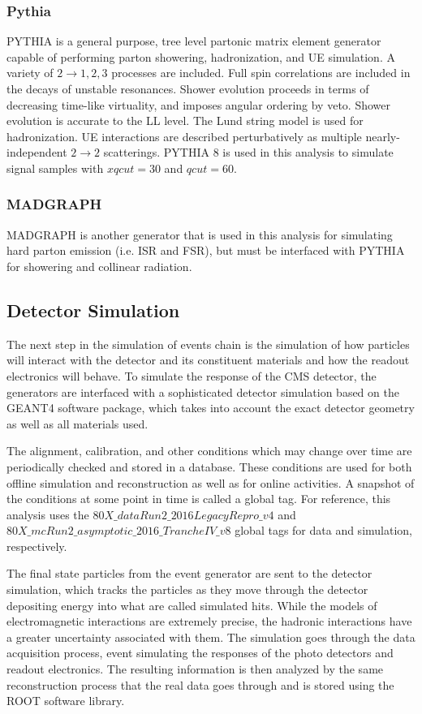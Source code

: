 \subsubsection{Pythia}

PYTHIA\cite{Sjostrand:2014zea} is a general purpose, tree level partonic matrix element generator capable of performing parton showering, hadronization, and UE simulation. A variety of $2\rightarrow1,2,3$ processes are included. Full spin correlations are included in the decays of unstable resonances. Shower evolution proceeds in terms of decreasing time-like virtuality, and imposes angular ordering by veto. Shower evolution is accurate to the LL level. The Lund string model is used for hadronization. UE interactions are described perturbatively as multiple nearly-independent $2\rightarrow 2$ scatterings. PYTHIA 8 is used in this analysis to simulate signal samples with $xqcut=30$ and $qcut=60$.

\subsubsection{MADGRAPH}

MADGRAPH\cite{Alwall:1647049} is another generator that is used in this analysis for simulating hard parton emission (i.e. ISR and FSR), but must be interfaced with PYTHIA for showering and collinear radiation.

\subsection{Detector Simulation}

The next step in the simulation of events chain is the simulation of how particles will interact with the detector and its constituent materials and how the readout electronics will behave. To simulate the response of the CMS detector, the generators are interfaced with a sophisticated detector simulation based on the GEANT4\cite{geant4sim} software package, which takes into account the exact detector geometry as well as all materials used.

The alignment, calibration, and other conditions which may change over time are periodically checked and stored in a database. These conditions are used for both offline simulation and reconstruction as well as for online activities. A snapshot of the conditions at some point in time is called a global tag. For reference, this analysis uses the $80X\_dataRun2\_2016LegacyRepro\_v4$ and $80X\_mcRun2\_asymptotic\_2016\_TrancheIV\_v8$ global tags for data and simulation, respectively. 

The final state particles from the event generator are sent to the detector simulation, which tracks the particles as they move through the detector depositing energy into what are called simulated hits. While the models of electromagnetic interactions are extremely precise, the hadronic interactions have a greater uncertainty associated with them. The simulation goes through the data acquisition process, event simulating the responses of the photo detectors and readout electronics. The resulting information is then analyzed by the same reconstruction process that the real data goes through and is stored using the ROOT software library. 

